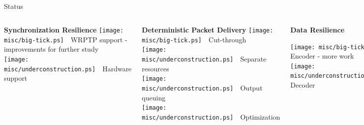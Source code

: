 \documentclass[compress,red]{beamer}
\begin{document}
\subsection{}
\begin{frame}{Status}


\begin{columns}[c]

    \begin{block}{{\bf Synchronization Resilience}}
      \texttt{[image: misc/big-tick.ps]}~~WRPTP support - improvements for further study \\
      \texttt{[image: misc/underconstruction.ps]}~~Hardware support
    \end{block}

    \begin{block}{{\bf Deterministic Packet Delivery}}
      \texttt{[image: misc/big-tick.ps]}~~Cut-through \\
      \texttt{[image: misc/underconstruction.ps]}~~Separate resources \\
      \texttt{[image: misc/underconstruction.ps]}~~Output queuing \\
      \texttt{[image: misc/underconstruction.ps]}~~Optimization
    \end{block}

    \begin{block}{{\bf Data Resilience}}

      \texttt{[image: misc/big-tick.ps]}~~FEC Encoder - more work \\
      \texttt{[image: misc/underconstruction.ps]}~~FEC Decoder

    \end{block}

    \begin{block}{ {\bf Topology redundancy}}
      \texttt{[image: misc/big-tick.ps]}~~Extensive study \\
      \texttt{[image: misc/underconstruction.ps]}~~Hardware/software
    \end{block}

    \begin{block}{  {\bf Diagnostics}}
      \texttt{[image: misc/underconstruction.ps]}~~Software
    \end{block}


\end{columns}
\end{frame}
\end{document}
